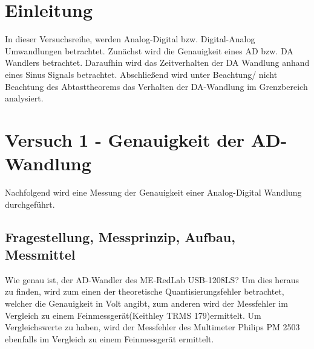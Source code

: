 \documentclass[12pt,oneside,a4paper]{report}
\begin{document}




\clearpage

%
%


%
%


%
%


%
%




\setcounter{page}{1}
%
%
\chapter{Einleitung}
\label{chap:EINL}
In dieser Versuchsreihe, werden Analog-Digital bzw. Digital-Analog Umwandlungen betrachtet. 
Zunächst wird die Genauigkeit eines AD bzw. DA Wandlers betrachtet. Daraufhin wird das Zeitverhalten der DA Wandlung anhand eines Sinus Signals betrachtet. Abschließend wird unter Beachtung/ nicht Beachtung des Abtasttheorems das Verhalten der DA-Wandlung im Grenzbereich analysiert.

%
%
\chapter{Versuch 1 - Genauigkeit der AD-Wandlung}
\label{chap:VERSUCH_1}
Nachfolgend wird eine Messung der Genauigkeit einer Analog-Digital Wandlung durchgeführt.

\section{Fragestellung, Messprinzip, Aufbau, Messmittel}
\label{chap:VERSUCH_1_FRAGESTELLUNG}
Wie genau ist, der AD-Wandler des ME-RedLab USB-1208LS?
Um dies heraus zu finden, wird zum einen der theoretische Quantisierungsfehler betrachtet, welcher die Genauigkeit in Volt angibt, zum anderen wird der Messfehler im Vergleich zu einem Feinmessgerät(Keithley TRMS 179)ermittelt.
Um Vergleichswerte zu haben, wird der Messfehler des Multimeter Philips PM 2503 ebenfalls im Vergleich zu einem Feinmessgerät ermittelt.
\end{document}

